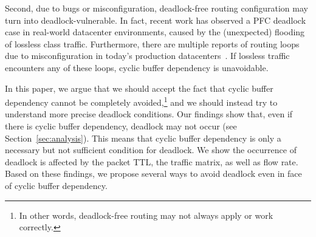 Second, due to bugs or misconfiguration, deadlock-free routing configuration may
turn into deadlock-vulnerable. In fact, recent work has observed a PFC deadlock
case in real-world datacenter environments\cite{rdmascale}, caused by the
(unexpected) flooding of lossless class traffic. Furthermore, there are multiple
reports of routing loops due to misconfiguration in today's production
datacenters~\cite{everflow, libra}. If lossless traffic encounters any of these
loops, cyclic buffer dependency is unavoidable.

In this paper, we argue that we should accept the fact that cyclic buffer
dependency cannot be completely avoided,\footnote{In other words, deadlock-free
routing may not always apply or work correctly.} and we should instead try to
understand more precise deadlock conditions.  Our findings show that, even if
there is cyclic buffer dependency, deadlock may not occur (see
Section~\ref{sec:analysis}).  This means that cyclic buffer dependency is only a
necessary but not sufficient condition for deadlock.  We show the occurrence of
deadlock is affected by the packet TTL, the traffic matrix, as well as flow
rate. Based on these findings, we propose several ways to avoid deadlock even in
face of cyclic buffer dependency.


